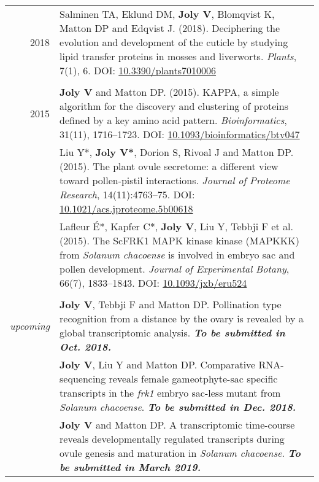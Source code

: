 \documentclass[letterpaper,12pt]{article}
\begin{document}
\begin{tabularx}{\textwidth}{@{}r|X@{}}

2018
& Salminen TA, Eklund DM, \textbf{Joly V}, Blomqvist K, Matton DP
  and Edqvist J. (2018).
  Deciphering the evolution and development of the cuticle by studying lipid
  transfer proteins in mosses and liverworts.
  \emph{Plants}, 7(1), 6.
  DOI: \href{http://doi.org/10.3390/plants7010006}{10.3390/plants7010006}
  \\

\multicolumn{2}{c}{} \\

2015
& \textbf{Joly V} and Matton DP. (2015).
  KAPPA, a simple algorithm for the discovery and clustering of proteins defined
  by a key amino acid pattern.
  \emph{Bioinformatics}, 31(11), 1716--1723.
  DOI: \href{http://doi.org/10.1093/bioinformatics/btv047}
  {10.1093/bioinformatics/btv047}
  \vspace{3mm}
  \\

& Liu Y*, \textbf{Joly V*}, Dorion S, Rivoal J and Matton DP. (2015).
  The plant ovule secretome: a different view toward pollen-pistil interactions.
  \emph{Journal of Proteome Research}, 14(11):4763--75.
  DOI: \href{http://doi.org/10.1021/acs.jproteome.5b00618}
  {10.1021/acs.jproteome.5b00618}
  \vspace{3mm}
  \\

& Lafleur É*, Kapfer C*, \textbf{Joly V}, Liu Y, Tebbji F et al. (2015).
  The ScFRK1 MAPK kinase kinase (MAPKKK) from \emph{Solanum chacoense} is
  involved in embryo sac and pollen development.
  \emph{Journal of Experimental Botany}, 66(7), 1833--1843.
  DOI: \href{http://doi.org/10.1093/jxb/eru524}{10.1093/jxb/eru524}
  \\

\multicolumn{2}{c}{} \\

{\em upcoming}
& \textbf{Joly V}, Tebbji F and Matton DP.
  Pollination type recognition from a distance by the ovary is revealed by a
  global transcriptomic analysis.
  {\bfseries\em To be submitted in Oct. 2018.}
  \vspace{3mm}
  \\

& \textbf{Joly V}, Liu Y and Matton DP.
  Comparative RNA-sequencing reveals female gameotphyte-sac specific transcripts
  in the \emph{frk1} embryo sac-less mutant from \emph{Solanum chacoense}.
  {\bfseries\em To be submitted in Dec. 2018.}
  \vspace{3mm}
  \\

& \textbf{Joly V} and Matton DP.
  A transcriptomic time-course reveals developmentally regulated transcripts
  during ovule genesis and maturation in \emph{Solanum chacoense}.
  {\bfseries\em To be submitted in March 2019.} \\

\end{tabularx}
\end{document}
